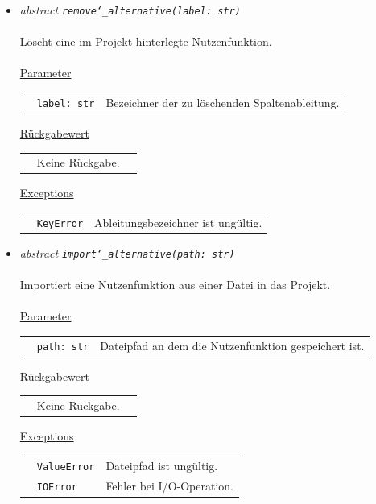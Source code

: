 \documentclass{article}
\begin{document}
\begin{itemize}
\item \textit{\flqq{}abstract\frqq} \texttt{\textit{remove\char`_alternative(label: str)}}\\\\
Löscht eine im Projekt hinterlegte Nutzenfunktion.
\\\\
\underline{Parameter}\\
\begin{tabular}{lll}
 & \texttt{label: str} & Bezeichner der zu löschenden Spaltenableitung.\\
\end{tabular}

\underline{Rückgabewert}\\
\begin{tabular}{lll}
 & Keine Rückgabe.\\
\end{tabular}

\underline{Exceptions}\\
\begin{tabular}{lll}
 & \texttt{KeyError} & Ableitungsbezeichner ist ungültig.\\
\end{tabular}


\item \textit{\flqq{}abstract\frqq} \texttt{\textit{import\char`_alternative(path: str)}}\\\\
Importiert eine Nutzenfunktion aus einer Datei in das Projekt.
\\\\
\underline{Parameter}\\
\begin{tabular}{lll}
 & \texttt{path: str} & Dateipfad an dem die Nutzenfunktion gespeichert ist.\\
\end{tabular}

\underline{Rückgabewert}\\
\begin{tabular}{lll}
 & Keine Rückgabe.\\
\end{tabular}

\underline{Exceptions}\\
\begin{tabular}{lll}
 & \texttt{ValueError} & Dateipfad ist ungültig.\\
 & \texttt{IOError} & Fehler bei I/O-Operation.\\
\end{tabular}



\end{itemize}
\end{document}
